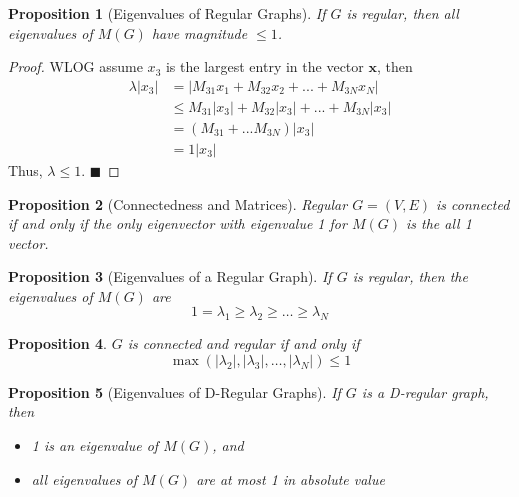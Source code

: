 \documentclass[11pt]{book}
\newcommand{\bx}{\mathbf{x}}
\newcommand{\qed}{\hfill $\blacksquare$}
\newtheorem{proposition}{Proposition}[chapter]
\begin{document}
\begin{proposition}[Eigenvalues of Regular Graphs]
	If $G$ is regular, then all eigenvalues of $M(G)$ have magnitude $\leq 1$. 
\end{proposition}

\begin{proof}
	WLOG assume $x_3$ is the largest entry in the vector $\bx$, then
	\begin{align}
		\lambda |x_3| 
		&= |M_{31}x_1 + M_{32}x_2 + ... + M_{3N}x_N| \\
		&\leq M_{31}|x_3| + M_{32}|x_3| + ... + M_{3N} |x_3| \\
		&= (M_{31} + ... M_{3N}) |x_3| \\
		&= 1 |x_3|
	\end{align}
	Thus, $\lambda \leq 1$. \qed
\end{proof}

\begin{proposition}[Connectedness and Matrices]
	Regular $G = (V, E)$ is connected if and only if the only eigenvector with eigenvalue 1 for $M(G)$ is the all 1 vector. 
\end{proposition}

\begin{proposition}[Eigenvalues of a Regular Graph]
	If $G$ is regular, then the eigenvalues of $M(G)$ are 
	\begin{equation}
		1 = \lambda_1 \geq \lambda_2 \geq \dots \geq \lambda_N
	\end{equation}
\end{proposition}

\begin{proposition}
	$G$ is connected and regular if and only if 
	\begin{equation}
		\max ( |\lambda_2| , |\lambda_3|, \dots, |\lambda_N|) \leq 1
	\end{equation}
\end{proposition}

\begin{proposition}[Eigenvalues of D-Regular Graphs]
	If $G$ is a D-regular graph, then
	\begin{itemize}
		\item 1 is an eigenvalue of $M(G)$, and 
		\item all eigenvalues of $M(G)$ are at most 1 in absolute value
	\end{itemize}
\end{proposition}
\end{document}
